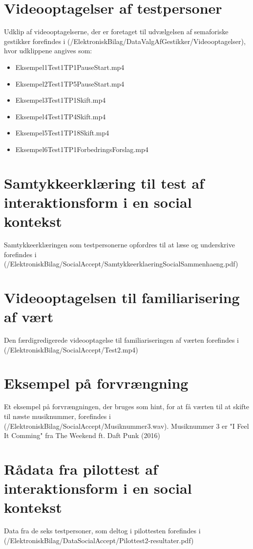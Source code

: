 \section{Videooptagelser af testpersoner}
\label{app:VideooptagelseValgAfGestikkerTestpersoner}
%
Udklip af videooptagelserne, der er foretaget til udvælgelsen af semaforiske gestikker forefindes i (/ElektroniskBilag/DataValgAfGestikker/Videooptagelser), hvor udklippene angives som: \blankline
%
\begin{itemize}
  \item Eksempel1Test1TP1PauseStart.mp4
  \item Eksempel2Test1TP5PauseStart.mp4 
  \item Eksempel3Test1TP1Skift.mp4 
  \item Eksempel4Test1TP4Skift.mp4
  \item Eksempel5Test1TP18Skift.mp4 
  \item Eksempel6Test1TP1ForbedringsForslag.mp4
\end{itemize}
%
\section{Samtykkeerklæring til test af interaktionsform i en social kontekst}
\label{app:SamtykkeerklaeringSocialAccept}
%
Samtykkeerklæringen som testpersonerne opfordres til at læse og underskrive forefindes i (/ElektroniskBilag/SocialAccept/SamtykkeerklaeringSocialSammenhaeng.pdf)
%
\section{Videooptagelsen til familiarisering af vært}
\label{app:VideooptagelseFam}
%
Den færdigredigerede videooptagelse til familiariseringen af værten forefindes i (/ElektroniskBilag/SocialAccept/Test2.mp4)
%
\section{Eksempel på forvrængning}
\label{app:ForvraengningHint}
%
Et eksempel på forvrængningen, der bruges som hint, for at få værten til at skifte til næste musiknummer, forefindes i (/ElektroniskBilag/SocialAccept/Musiknummer3.wav). Musiknummer 3 er "I Feel It Comming" fra The Weekend ft. Daft Punk (2016)
%
\section{Rådata fra pilottest af interaktionsform i en social kontekst}
\label{app:ResultaterPilottestSocialAccept}
%
Data fra de seks testpersoner, som deltog i pilottesten forefindes i \\
(/ElektroniskBilag/DataSocialAccept/Pilottest2-resultater.pdf)
%
